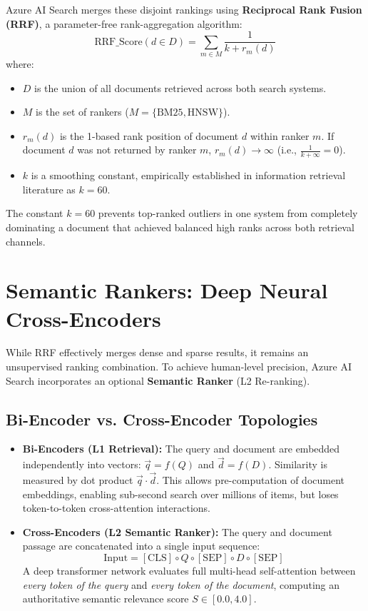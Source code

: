 Azure AI Search merges these disjoint rankings using \textbf{Reciprocal Rank Fusion (RRF)}, a parameter-free rank-aggregation algorithm:
\begin{equation}
\text{RRF\_Score}(d \in D) = \sum_{m \in M} \frac{1}{k + r_m(d)}
\end{equation}
where:
\begin{itemize}[leftmargin=12pt]
  \item $D$ is the union of all documents retrieved across both search systems.
  \item $M$ is the set of rankers ($M = \{\text{BM25}, \text{HNSW}\}$).
  \item $r_m(d)$ is the 1-based rank position of document $d$ within ranker $m$. If document $d$ was not returned by ranker $m$, $r_m(d) \to \infty$ (i.e., $\frac{1}{k + \infty} = 0$).
  \item $k$ is a smoothing constant, empirically established in information retrieval literature as $k = 60$.
\end{itemize}

The constant $k=60$ prevents top-ranked outliers in one system from completely dominating a document that achieved balanced high ranks across both retrieval channels.

\section{Semantic Rankers: Deep Neural Cross-Encoders}

While RRF effectively merges dense and sparse results, it remains an unsupervised ranking combination. To achieve human-level precision, Azure AI Search incorporates an optional \textbf{Semantic Ranker} (L2 Re-ranking).

\subsection{Bi-Encoder vs. Cross-Encoder Topologies}
\begin{itemize}[leftmargin=12pt]
  \item \textbf{Bi-Encoders (L1 Retrieval):} The query and document are embedded independently into vectors: $\vec{q} = f(Q)$ and $\vec{d} = f(D)$. Similarity is measured by dot product $\vec{q} \cdot \vec{d}$. This allows pre-computation of document embeddings, enabling sub-second search over millions of items, but loses token-to-token cross-attention interactions.
  \item \textbf{Cross-Encoders (L2 Semantic Ranker):} The query and document passage are concatenated into a single input sequence:
  \begin{equation}
  \text{Input} = [\text{CLS}] \circ Q \circ [\text{SEP}] \circ D \circ [\text{SEP}]
  \end{equation}
  A deep transformer network evaluates full multi-head self-attention between \emph{every token of the query} and \emph{every token of the document}, computing an authoritative semantic relevance score $S \in [0.0, 4.0]$.
\end{itemize}

